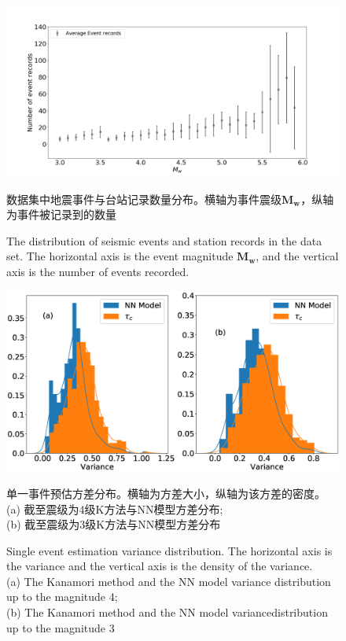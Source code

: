\begin{figure}[!h] 
\centering 
 \includegraphics[width=\linewidth]{img/M-N.png} 
 \renewcommand{\figurename}{图} 
\caption{数据集中地震事件与台站记录数量分布。横轴为事件震级$\mathbf{M}_{\mathbf{w}}$，纵轴为事件被记录到的数量} 
\addtocounter{figure}{-1} \vspace{-5pt} 
\renewcommand{\figurename}{Fig} 
\caption{The distribution of seismic events and station records in the data set. The horizontal axis is the event magnitude $\mathbf{M}_{\mathbf{w}}$, and the vertical axis is the number of events recorded.} 
\renewcommand{\figurename}{图} 
\label{fig:network-device-influence.png} 
\end{figure}
\begin{figure}[!h] 
\centering 
 \includegraphics[width=\linewidth]{img/9.eps} 
 \renewcommand{\figurename}{图} 
\caption{单一事件预估方差分布。横轴为方差大小，纵轴为该方差的密度。\\
(a) 截至震级为4级K方法与NN模型方差分布;\\
(b) 截至震级为3级K方法与NN模型方差分布\\
} 
\addtocounter{figure}{-1} \vspace{-5pt} 
\renewcommand{\figurename}{Fig} 
\caption{Single event estimation variance distribution. The horizontal axis is the variance and the vertical axis is the density of the variance.\\
(a) The Kanamori method and the NN model variance distribution up to the
magnitude 4; \\
(b) The Kanamori method and the NN model variancedistribution up to the magnitude 3} 
\renewcommand{\figurename}{图} 
\label{fig:network-device-influence.png} 
\end{figure}

